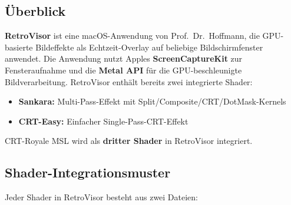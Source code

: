\documentclass[11pt, a4paper]{article}
\begin{document}
\subsection{\"Uberblick}
\vspace{.75cm}
\textbf{RetroVisor} ist eine macOS-Anwendung von Prof.~Dr.~Hoffmann, die GPU-basierte \newline Bildeffekte als Echtzeit-Overlay auf beliebige Bildschirmfenster anwendet. \newline Die Anwendung nutzt Apples \textbf{ScreenCaptureKit} zur Fensteraufnahme \newline und die \textbf{Metal API} f\"ur die GPU-beschleunigte Bildverarbeitung.
\vspace{.75cm} \newline 
RetroVisor enth\"alt bereits zwei integrierte Shader: \vspace{.5cm} 
\begin{itemize}[leftmargin=*, nosep]
    \item \textbf{Sankara:} Multi-Pass-Effekt mit Split/Composite/CRT/DotMask-Kernels
    \item \textbf{CRT-Easy:} Einfacher Single-Pass-CRT-Effekt
\end{itemize}
\vspace{.5cm}
CRT-Royale MSL wird als \textbf{dritter Shader} in RetroVisor integriert.
\newpage \vspace*{-.25cm}

\subsection{Shader-Integrationsmuster}
\vspace{.5cm}
Jeder Shader in RetroVisor besteht aus zwei Dateien: \vspace{.25cm}
\end{document}

